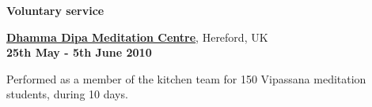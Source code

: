\halfblankline

\textbf{Voluntary service}
\begin{outerlist}

\item[] \href{http://www.dipa.dhamma.org/}{\textbf{Dhamma Dipa Meditation
Centre}}, Hereford, UK%
        \\ \textbf{25th May - 5th June 2010}
\begin{innerlist}
\item Performed as a member of the kitchen team for 150 Vipassana meditation
students, during 10 days.
\end{innerlist}
\end{outerlist}

% 

% 
% 
% 

